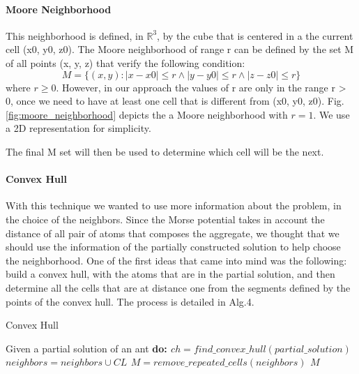 		\paragraph*{Moore Neighborhood}
			This neighborhood is defined, in $\mathbb{R}^3$, by the cube that is centered in a the current cell (x0, y0, z0). The Moore neighborhood of range r can be defined by the set M of all points (x, y, z) that verify the following condition:
			\begin{equation}
				M= \{(x,y):|x-x0| \leq r \wedge |y-y0| \leq r \wedge |z-z0| \leq r\}
			\end{equation}
			where $r \geq 0$. However, in our approach the values of r are only in the range r > 0, once we need to have at least one cell that is different from (x0, y0, z0). Fig. \ref{fig:moore_neighborhood} depicts the a Moore neighborhood with $r = 1$. We use a 2D representation for simplicity. 
			
			
			The final M set will then be used to determine which cell will be the next.
			
			\paragraph*{Convex Hull}
			With this technique we wanted to use more information about the problem, in the choice of the neighbors. Since the Morse potential takes in account the distance of all pair of atoms that composes the aggregate, we thought that we should use the information of the partially constructed solution to help choose the neighborhood. One of the first ideas that came into mind was the following: build a convex hull, with the atoms that are in the partial solution, and then determine all the cells that are at distance one from the segments defined by the points of the convex hull. The process is detailed in Alg.4.
			\begin{algorithm}
				\caption{Convex Hull}
				\label{alg:convex_hull}
				\begin{algorithmic}
				\STATE Given a partial solution of an ant \bf{do}:
				\STATE $ch = find\_convex\_hull(partial\_solution)$
							\STATE $neighbors = neighbors \cup CL$
						\ENDIF
					\ENDFOR
				\ENDFOR
				\STATE $M = remove\_repeated\_cells(neighbors)$
				\RETURN $M$
				\end{algorithmic}
			\end{algorithm}
			
